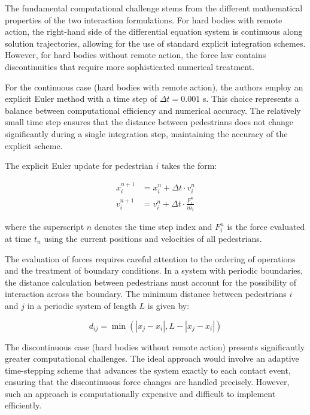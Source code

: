 \documentclass[12pt,a4paper]{article}
\begin{document}
The fundamental computational challenge stems from the different mathematical properties of the two interaction formulations. For hard bodies with remote action, the right-hand side of the differential equation system is continuous along solution trajectories, allowing for the use of standard explicit integration schemes. However, for hard bodies without remote action, the force law contains discontinuities that require more sophisticated numerical treatment.

For the continuous case (hard bodies with remote action), the authors employ an explicit Euler method with a time step of $\Delta t = 0.001$ s. This choice represents a balance between computational efficiency and numerical accuracy. The relatively small time step ensures that the distance between pedestrians does not change significantly during a single integration step, maintaining the accuracy of the explicit scheme.

The explicit Euler update for pedestrian $i$ takes the form:

\begin{align}
x_i^{n+1} &= x_i^n + \Delta t \cdot v_i^n \\
v_i^{n+1} &= v_i^n + \Delta t \cdot \frac{F_i^n}{m_i}
\end{align}

where the superscript $n$ denotes the time step index and $F_i^n$ is the force evaluated at time $t_n$ using the current positions and velocities of all pedestrians.

The evaluation of forces requires careful attention to the ordering of operations and the treatment of boundary conditions. In a system with periodic boundaries, the distance calculation between pedestrians must account for the possibility of interaction across the boundary. The minimum distance between pedestrians $i$ and $j$ in a periodic system of length $L$ is given by:

\begin{equation}
d_{ij} = \min(|x_j - x_i|, L - |x_j - x_i|)
\end{equation}

The discontinuous case (hard bodies without remote action) presents significantly greater computational challenges. The ideal approach would involve an adaptive time-stepping scheme that advances the system exactly to each contact event, ensuring that the discontinuous force changes are handled precisely. However, such an approach is computationally expensive and difficult to implement efficiently.
\end{document}
